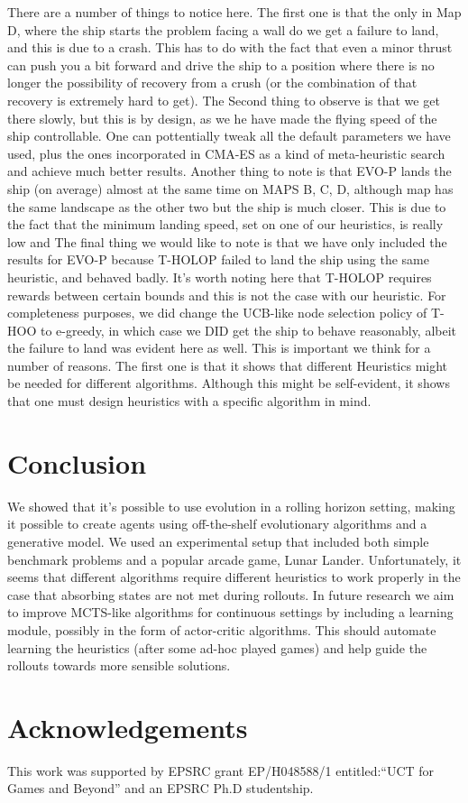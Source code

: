 \documentclass[conference]{IEEEtran}
\begin{document}
There are a number of things to notice here. The first one is that the only in Map D, where the ship starts the problem facing a wall do we get a failure to land, and this is due to a crash. This has to do with the fact that even a minor thrust can push you a bit forward and drive the ship to a position where there is no longer the possibility of recovery from a crush (or the combination of that recovery is extremely hard to get). The Second thing to observe is that we get there slowly, but this is by design, as we he have made the flying speed of the ship controllable. One can pottentially tweak all the default parameters we have used, plus the ones incorporated in CMA-ES as a kind of meta-heuristic search and achieve much better results. Another thing to note is that EVO-P lands the ship (on average) almost at the same time on MAPS B, C, D, although map has the same landscape as the other two but the ship is much closer. This is due to the fact that the minimum landing speed, set on one of our heuristics, is really low and The final thing we would like to note is that we have only included the results for EVO-P because T-HOLOP failed to land the ship using the same heuristic, and behaved badly. It's worth noting here that T-HOLOP requires rewards between certain bounds and this is not the case with our heuristic. For completeness purposes, we did change the UCB-like node selection policy of T-HOO to e-greedy, in which case we DID get the ship to behave reasonably, albeit the failure to land was evident here as well. This is important we think for a number of reasons. The first one is that it shows that different Heuristics might be needed for different algorithms. Although this might be self-evident, it shows that one must design heuristics with a specific algorithm in mind. 


\section{Conclusion} \label{sec:conclusion}
We showed that it's possible to use evolution in a rolling horizon setting, making it possible to create agents using off-the-shelf evolutionary algorithms and a generative model. We used an experimental setup that included both simple benchmark problems and a popular arcade game, Lunar Lander. Unfortunately, it seems that different algorithms require different heuristics to work properly in the case that absorbing states are not met during rollouts. In future research we aim to improve MCTS-like algorithms for continuous settings by including a learning module, possibly in the form of actor-critic algorithms. This should automate learning the heuristics (after some ad-hoc played games) and help guide the rollouts towards more sensible solutions. 

 
\section*{Acknowledgements}
This work was supported by EPSRC grant EP/H048588/1 entitled:``UCT for Games and Beyond'' and an EPSRC Ph.D studentship. 





\end{document}
